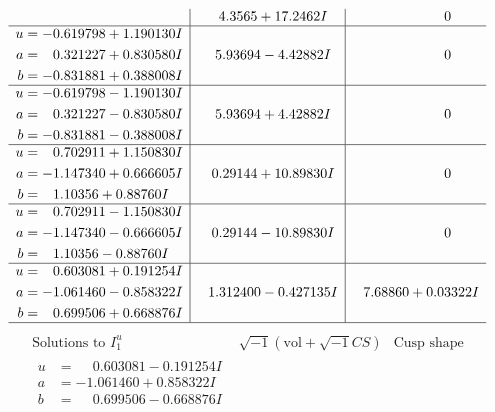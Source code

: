 \documentclass[1p]{elsarticle_modified}
\theoremstyle{definition}
\newcommand{\I}{\sqrt{-1}}
\begin{document}
$$\begin{array}{c|c|c}
 & \phantom{-}4.3565 + 17.2462 I & \phantom{-0.000000 } 0 \\ \hline\begin{aligned}
u &= -0.619798 + 1.190130 I \\
a &= \phantom{-}0.321227 + 0.830580 I \\
b &= -0.831881 + 0.388008 I\end{aligned}
 & \phantom{-}5.93694 - 4.42882 I & \phantom{-0.000000 } 0 \\ \hline\begin{aligned}
u &= -0.619798 - 1.190130 I \\
a &= \phantom{-}0.321227 - 0.830580 I \\
b &= -0.831881 - 0.388008 I\end{aligned}
 & \phantom{-}5.93694 + 4.42882 I & \phantom{-0.000000 } 0 \\ \hline\begin{aligned}
u &= \phantom{-}0.702911 + 1.150830 I \\
a &= -1.147340 + 0.666605 I \\
b &= \phantom{-}1.10356 + 0.88760 I\end{aligned}
 & \phantom{-}0.29144 + 10.89830 I & \phantom{-0.000000 } 0 \\ \hline\begin{aligned}
u &= \phantom{-}0.702911 - 1.150830 I \\
a &= -1.147340 - 0.666605 I \\
b &= \phantom{-}1.10356 - 0.88760 I\end{aligned}
 & \phantom{-}0.29144 - 10.89830 I & \phantom{-0.000000 } 0 \\ \hline\begin{aligned}
u &= \phantom{-}0.603081 + 0.191254 I \\
a &= -1.061460 - 0.858322 I \\
b &= \phantom{-}0.699506 + 0.668876 I\end{aligned}
 & \phantom{-}1.312400 - 0.427135 I & \phantom{-}7.68860 + 0.03322 I\\
 \hline 
 \end{array}$$\newpage$$\begin{array}{c|c|c}  
\text{Solutions to }I^u_{1}& \I (\text{vol} + \sqrt{-1}CS) & \text{Cusp shape}\\
 \hline 
\begin{aligned}
u &= \phantom{-}0.603081 - 0.191254 I \\
a &= -1.061460 + 0.858322 I \\
b &= \phantom{-}0.699506 - 0.668876 I\end{aligned}

\end{array}$$
\end{document}
